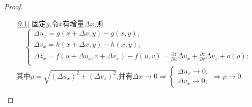 \begin{proof}
    \begin{enumerate}
        \item[\ref{9.1}] 固定$y$,令$x$有增量$\Delta x$,则
        $$\begin{cases}
            \Delta u_x = g(x+\Delta x,y)-g(x,y),\\
            \Delta v_x = h(x+\Delta x,y)-h(x,y),\\
            \Delta z_x = f(u+\Delta u_x,v+\Delta v_x)-f(u,v) = \frac{\partial z}{\partial u}\Delta u_x+\frac{\partial z}{\partial v}\Delta v_x + o(\rho);\\
        \end{cases}$$
        其中$\rho=\sqrt{\left(\Delta u_x\right)^2+\left(\Delta v_x\right)^2}$,并有$\Delta x\to 0\Rightarrow \begin{cases}
            \Delta u_x\to 0,\\
            \Delta v_x\to 0;
        \end{cases}\Rightarrow \rho \to 0.$


\end{enumerate}
\end{proof}
